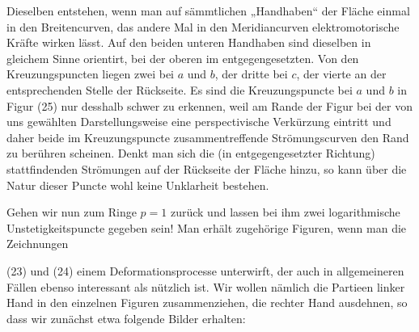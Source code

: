 \documentclass{article}
\begin{document}

Dieselben entstehen, wenn man auf sämmtlichen „Handhaben“ der Fläche einmal in den Breitencurven, das andere Mal in den Meridiancurven elektromotorische Kräfte wirken lässt. Auf den beiden unteren Handhaben sind dieselben in gleichem Sinne orientirt, bei der oberen im entgegengesetzten. Von den Kreuzungspuncten liegen zwei bei $a$ und $b$, der dritte bei $c$, der vierte an der entsprechenden Stelle der Rückseite. Es sind die Kreuzungspuncte bei $a$ und $b$ in Figur (25) nur desshalb schwer zu erkennen, weil am Rande der Figur bei der von uns gewählten Darstellungsweise eine perspectivische Verkürzung eintritt und daher beide im Kreuzungspuncte zusammentreffende Strömungscurven den Rand zu berühren scheinen. Denkt man sich die (in entgegengesetzter Richtung) stattfindenden Strömungen auf der Rückseite der Fläche hinzu, so kann über die Natur dieser Puncte wohl keine Unklarheit bestehen.

Gehen wir nun zum Ringe $p = 1$ zurück und lassen bei ihm zwei logarithmische Unstetigkeitspuncte gegeben sein! Man erhält zugehörige Figuren, wenn man die Zeichnungen

(23) und (24) einem Deformationsprocesse unterwirft, der auch in allgemeineren Fällen ebenso interessant als nützlich ist. Wir wollen nämlich die Partieen linker Hand in den einzelnen Figuren zusammenziehen, die rechter Hand ausdehnen, so dass wir zunächst etwa folgende Bilder erhalten:

\end{document}
